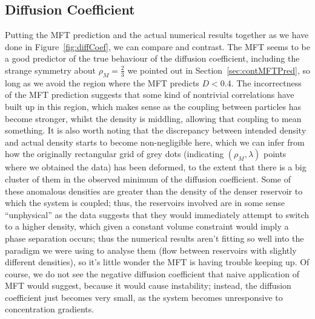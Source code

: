 \subsection{Diffusion Coefficient}
Putting the MFT prediction and the actual numerical results together as we have done in Figure~\ref{fig:diffCoef}, we can compare and contrast. The MFT seems to be a good predictor of the true behaviour of the diffusion coefficient,
including the strange symmetry about $\rho_M=\frac{2}{3}$ we pointed out in Section~\ref{sec:contMFTPred}, so long as we avoid the region where the MFT predicts $D<0.4$. The incorrectness of the MFT prediction suggests that some kind of nontrivial
correlations have built up in this region, which makes sense as the coupling between particles has become stronger, whilst the density is middling, allowing that coupling to mean something. It is also worth noting that the discrepancy between
intended density and actual density starts to become non-negligible here, which we can infer from how the originally rectangular grid of grey dots
(indicating $(\rho_M, \lambda)$ points where we obtained the data) has been deformed, to the extent that there is a big cluster of them in the observed minimum of the diffusion coefficient. Some of these anomalous densities are greater
than the density of the denser reservoir to which the system is coupled; thus, the reservoirs involved are in some sense ``unphysical'' as the data suggests that they would immediately attempt to switch to a higher density, which given a
constant volume constraint would imply a phase separation occurs; thus the numerical results aren't fitting so well into the paradigm we were using to analyse them (flow between reservoirs with slightly different densities),
so it's little wonder the MFT is having trouble keeping up. Of course, we do not see the negative diffusion coefficient that naive application of MFT would suggest, because it would cause instability; instead, the diffusion coefficient just
becomes very small, as the system becomes unresponsive to concentration gradients.
